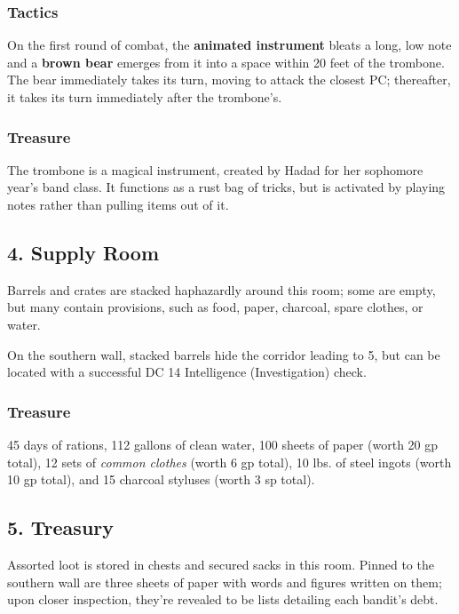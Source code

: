 \documentclass[10pt,a4paper,twoside,bg=print,twocolumn,openany,nodeprecatedcode]{dndbook}
\begin{document}
\subsubsection{Tactics}
On the first round of combat, the \textbf{animated instrument} bleats a long, low note and a \textbf{brown bear} emerges from it into a space within 20 feet of the trombone. The bear immediately takes its turn, moving to attack the closest PC; thereafter, it takes its turn immediately after the trombone's.

\subsubsection{Treasure}
The trombone is a magical instrument, created by Hadad for her sophomore year's band class. It functions as a rust bag of tricks, but is activated by playing notes rather than pulling items out of it.

\subsection{4. Supply Room}
Barrels and crates are stacked haphazardly around this room; some are empty, but many contain provisions, such as food, paper, charcoal, spare clothes, or water.

On the southern wall, stacked barrels hide the corridor leading to 5, but can be located with a successful DC 14 Intelligence (Investigation) check.

\subsubsection{Treasure}
45 days of rations, 112 gallons of clean water, 100 sheets of paper (worth 20 gp total), 12 sets of \textit{common clothes} (worth 6 gp total), 10 lbs. of steel ingots (worth 10 gp total), and 15 charcoal styluses (worth 3 sp total).

\subsection{5. Treasury}
\begin{DndReadAloud}{}
Assorted loot is stored in chests and secured sacks in this room. Pinned to the southern wall are three sheets of paper with words and figures written on them; upon closer inspection, they're revealed to be lists detailing each bandit's debt.

\end{DndReadAloud}
\end{document}
